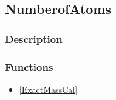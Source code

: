 \subsection{NumberofAtoms}\label{NumberofAtoms}
\subsubsection{Description}
\subsubsection{Functions}
\begin{itemize}
\item \ref{ExactMassCal}
\end{itemize}

